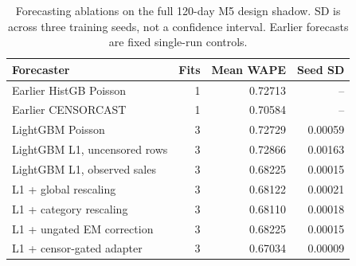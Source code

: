 \begin{table}[t]
\centering\small
\caption{Forecasting ablations on the full 120-day M5 design shadow. SD is across three training seeds, not a confidence interval. Earlier forecasts are fixed single-run controls.}
\label{tab:point}
\begin{tabular}{lrrr}
\toprule
Forecaster & Fits & Mean WAPE & Seed SD\\
\midrule
Earlier HistGB Poisson & 1 & 0.72713 & --\\
Earlier CENSORCAST & 1 & 0.70584 & --\\
LightGBM Poisson & 3 & 0.72729 & 0.00059\\
LightGBM L1, uncensored rows & 3 & 0.72866 & 0.00163\\
LightGBM L1, observed sales & 3 & 0.68225 & 0.00015\\
L1 + global rescaling & 3 & 0.68122 & 0.00021\\
L1 + category rescaling & 3 & 0.68110 & 0.00018\\
L1 + ungated EM correction & 3 & 0.68225 & 0.00015\\
L1 + censor-gated adapter & 3 & 0.67034 & 0.00009\\
\bottomrule
\end{tabular}
\end{table}
